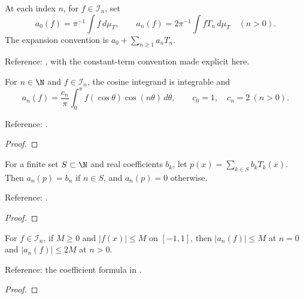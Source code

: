 \begin{definition}
\label{def:coefficients}
\leanok

At each index $n$, for $f\in\mathcal I_n$, set
\[a_0(f)=\pi^{-1}\int f\,d\mu_T,\qquad
 a_n(f)=2\pi^{-1}\int fT_n\,d\mu_T\quad(n>0).\]
The expansion convention is $a_0+\sum_{n\geq1}a_nT_n$.

Reference: \cite[Chapters 3 and 8]{atap},
with the constant-term convention made explicit here.
\end{definition}

\begin{theorem}
\label{thm:coefficient-cos}
\leanok

For $n\in\N$ and $f\in\mathcal I_n$, the cosine integrand is integrable and
\[a_n(f)=\frac{c_n}{\pi}\int_0^\pi f(\cos\theta)\cos(n\theta)\,d\theta,
\qquad c_0=1,\quad c_n=2\ (n>0).\]

Reference: \cite[Chapters 3 and 8]{atap}.
\end{theorem}
\begin{proof}
\leanok
\end{proof}

\begin{theorem}
\label{thm:coefficient-finite}
\leanok

For a finite set $S\subset\N$ and real coefficients $b_k$, let
$p(x)=\sum_{k\in S}b_kT_k(x)$. Then $a_n(p)=b_n$ if $n\in S$, and
$a_n(p)=0$ otherwise.

Reference: \cite[Chapter 3]{atap}.
\end{theorem}
\begin{proof}
\leanok
\end{proof}

\begin{theorem}
\label{thm:coefficient-bound}
\leanok
{}
For $f\in\mathcal I_n$, if $M\ge0$ and $|f(x)|\le M$ on $[-1,1]$,
then $|a_n(f)|\le M$ at $n=0$ and $|a_n(f)|\le2M$ at $n>0$.

Reference: the coefficient formula in \cite[Chapters 3 and 8]{atap}.
\end{theorem}
\begin{proof}
\leanok
\end{proof}

